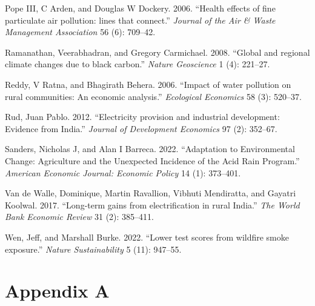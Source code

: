 \documentclass[
]{article}
\newlength{\cslhangindent}
\newlength{\cslentryspacingunit} %
\newenvironment{CSLReferences}[2] %
 {%
  \setlength{\parindent}{0pt}
  \ifodd #1
  \let\oldpar\par
  \def\par{\hangindent=\cslhangindent\oldpar}
  \fi
  \setlength{\parskip}{#2\cslentryspacingunit}
 }%
 {}
\newcommand{\beginappendix}{ \setcounter{table}{0} \renewcommand{\thetable}{A\arabic{table}} \setcounter{figure}{0} \renewcommand{\thefigure}{A\arabic{figure}} }
\begin{document}
\begin{CSLReferences}{1}{0}
\leavevmode{}%
Pope III, C Arden, and Douglas W Dockery. 2006. {``{Health effects of fine particulate air pollution: lines that connect}.''} \emph{{Journal of the Air \& Waste Management Association}} 56 (6): 709--42.

\leavevmode{}%
Ramanathan, Veerabhadran, and Gregory Carmichael. 2008. {``{Global and regional climate changes due to black carbon}.''} \emph{{Nature Geoscience}} 1 (4): 221--27.

\leavevmode{}%
Reddy, V Ratna, and Bhagirath Behera. 2006. {``{Impact of water pollution on rural communities: An economic analysis}.''} \emph{{Ecological Economics}} 58 (3): 520--37.

\leavevmode{}%
Rud, Juan Pablo. 2012. {``{Electricity provision and industrial development: Evidence from India}.''} \emph{{Journal of Development Economics}} 97 (2): 352--67.

\leavevmode{}%
Sanders, Nicholas J, and Alan I Barreca. 2022. {``{Adaptation to Environmental Change: Agriculture and the Unexpected Incidence of the Acid Rain Program}.''} \emph{{American Economic Journal: Economic Policy}} 14 (1): 373--401.

\leavevmode{}%
Van de Walle, Dominique, Martin Ravallion, Vibhuti Mendiratta, and Gayatri Koolwal. 2017. {``{Long-term gains from electrification in rural India}.''} \emph{{The World Bank Economic Review}} 31 (2): 385--411.

\leavevmode{}%
Wen, Jeff, and Marshall Burke. 2022. {``{Lower test scores from wildfire smoke exposure}.''} \emph{{Nature Sustainability}} 5 (11): 947--55.

\end{CSLReferences}

\FloatBarrier
\newpage

\hypertarget{appendix-a}{%
\section*{Appendix A}\label{appendix-a}}

\beginappendix
\FloatBarrier
\end{document}

